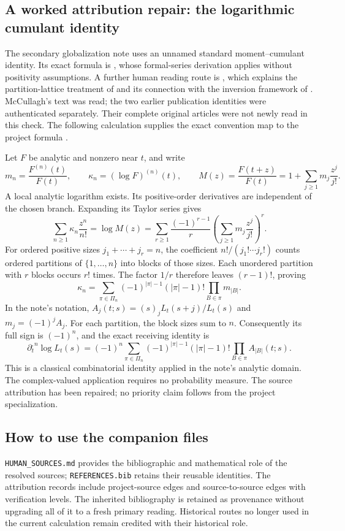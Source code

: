 \subsection{A worked attribution repair: the logarithmic cumulant identity}
The secondary globalization note uses an unnamed standard moment--cumulant
identity. Its exact formula is \citet[\S2.3.4, p.~38, equation~(2.9)]{McCullagh2018Tensor},
whose formal-series derivation applies without positivity assumptions.
A further human reading route is \citet[p.~2]{McCullagh2011SpeedCommentary},
which explains the partition-lattice treatment of \citet{Speed1983Cumulants}
and its connection with the inversion framework of \citet{Rota1964Mobius}.
McCullagh's text was read; the two earlier publication identities were
authenticated separately. Their complete original articles were not newly
read in this check. The following calculation supplies the exact convention
map to the project formula \citep{SplitZeroSecondary2026}.

Let \(F\) be analytic and nonzero near \(t\), and write
\[
 m_n=\frac{F^{(n)}(t)}{F(t)},\qquad
 \kappa_n=(\log F)^{(n)}(t),\qquad
 M(z)=\frac{F(t+z)}{F(t)}=1+\sum_{j\ge1}m_j\frac{z^j}{j!}.
\]
A local analytic logarithm exists. Its positive-order derivatives are
independent of the chosen branch. Expanding its Taylor series gives
\[
 \sum_{n\ge1}\kappa_n\frac{z^n}{n!}
 =\log M(z)
 =\sum_{r\ge1}\frac{(-1)^{r-1}}{r}
       \left(\sum_{j\ge1}m_j\frac{z^j}{j!}\right)^r.
\]
For ordered positive sizes \(j_1+\cdots+j_r=n\), the coefficient
\(n!/(j_1!\cdots j_r!)\) counts ordered partitions of
\(\{1,\ldots,n\}\) into blocks of those sizes. Each unordered partition
with \(r\) blocks occurs \(r!\) times. The factor \(1/r\) therefore leaves
\((r-1)!\), proving
\[
 \kappa_n=\sum_{\pi\in\Pi_n}
        (-1)^{|\pi|-1}(|\pi|-1)!\prod_{B\in\pi}m_{|B|}.
\]
In the note's notation,
\(A_j(t;s)=(s)_jL_t(s+j)/L_t(s)\) and
\(m_j=(-1)^jA_j\). For each partition, the block sizes sum to \(n\).
Consequently its full sign is \((-1)^n\), and the exact receiving identity is
\[
 \partial_t^{,n}\log L_t(s)
 =(-1)^n\sum_{\pi\in\Pi_n}
        (-1)^{|\pi|-1}(|\pi|-1)!\prod_{B\in\pi}A_{|B|}(t;s).
\]
This is a classical combinatorial identity applied in the note's analytic
domain. The complex-valued application requires no probability measure.
The source attribution has been repaired; no priority claim follows from
the project specialization.

\subsection{How to use the companion files}
\texttt{HUMAN\_SOURCES.md} provides the bibliographic and mathematical role
of the resolved sources; \texttt{REFERENCES.bib} retains their reusable
identities. The attribution records include project-source edges and
source-to-source edges with verification levels. The inherited bibliography
is retained as provenance without upgrading all of it to a fresh primary
reading. Historical routes no longer used in the current calculation remain
credited with their historical role.

